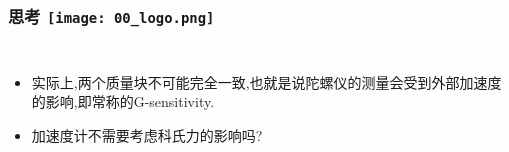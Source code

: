 
\begin{frame}
  \frametitle{思考 \hfill \texttt{[image: 00\_logo.png]}}
  \begin{columns}
    
    \begin{itemize}
      \item 实际上,两个质量块不可能完全一致,也就是说陀螺仪的测量会受到外部加速度的影响,即常称的G-sensitivity.
      
      \item 加速度计不需要考虑科氏力的影响吗?

    \end{itemize}
    

  
  \end{columns}
  \end{frame}    